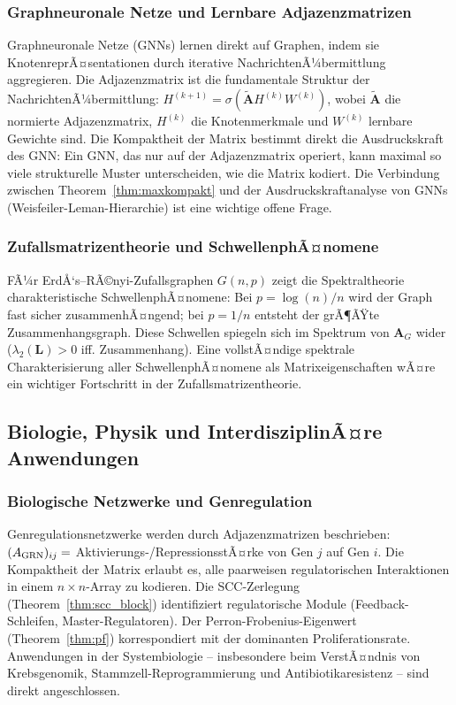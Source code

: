 ﻿\documentclass[12pt, a4paper]{article}
\theoremstyle{definition}
\theoremstyle{remark}
\newcommand{\vA}{\bm{A}}
\newcommand{\vL}{\bm{L}}
\begin{document}
\subsubsection*{Graphneuronale Netze und Lernbare Adjazenzmatrizen}

Graphneuronale Netze (GNNs) lernen direkt auf Graphen, indem sie
KnotenreprÃ¤sentationen durch iterative NachrichtenÃ¼bermittlung
aggregieren. Die Adjazenzmatrix ist die fundamentale Struktur der
NachrichtenÃ¼bermittlung: $H^{(k+1)} = \sigma(\tilde{\vA} H^{(k)} W^{(k)})$,
wobei $\tilde{\vA}$ die normierte Adjazenzmatrix, $H^{(k)}$ die
Knotenmerkmale und $W^{(k)}$ lernbare Gewichte sind. Die Kompaktheit
der Matrix bestimmt direkt die Ausdruckskraft des GNN: Ein GNN, das nur
auf der Adjazenzmatrix operiert, kann maximal so viele strukturelle
Muster unterscheiden, wie die Matrix kodiert. Die Verbindung zwischen
Theorem~\ref{thm:maxkompakt} und der Ausdruckskraftanalyse von GNNs
(Weisfeiler-Leman-Hierarchie) ist eine wichtige offene Frage.

\subsubsection*{Zufallsmatrizentheorie und SchwellenphÃ¤nomene}

FÃ¼r ErdÅ‘s--RÃ©nyi-Zufallsgraphen $G(n,p)$ zeigt die Spektraltheorie
charakteristische SchwellenphÃ¤nomene: Bei $p = \log(n)/n$ wird der
Graph fast sicher zusammenhÃ¤ngend; bei $p = 1/n$ entsteht der grÃ¶ÃŸte
Zusammenhangsgraph. Diese Schwellen spiegeln sich im Spektrum von
$\vA_G$ wider ($\lambda_2(\vL) > 0$ iff. Zusammenhang). Eine
vollstÃ¤ndige spektrale Charakterisierung aller SchwellenphÃ¤nomene
als Matrixeigenschaften wÃ¤re ein wichtiger Fortschritt in der
Zufallsmatrizentheorie.

\subsection{Biologie, Physik und InterdisziplinÃ¤re Anwendungen}
\label{subsec:interdisziplin}

\subsubsection*{Biologische Netzwerke und Genregulation}

Genregulationsnetzwerke werden durch Adjazenzmatrizen beschrieben:
$(A_{\rm GRN})_{ij} = $ Akti\-vierungs-/RepressionsstÃ¤rke von Gen $j$ auf
Gen $i$. Die Kompaktheit der Matrix erlaubt es, alle paarweisen
regulatorischen Interaktionen in einem $n \times n$-Array zu kodieren.
Die SCC-Zerlegung (Theorem~\ref{thm:scc_block}) identifiziert regulatorische
Module (Feedback-Schleifen, Master-Regulatoren). Der Perron-Frobenius-Eigenwert
(Theorem~\ref{thm:pf}) korrespondiert mit der dominanten
Proliferationsrate. Anwendungen in der Systembiologie -- insbesondere
beim VerstÃ¤ndnis von Krebsgenomik, Stammzell-Reprogrammierung und
Antibiotikaresistenz -- sind direkt angeschlossen.
\end{document}
